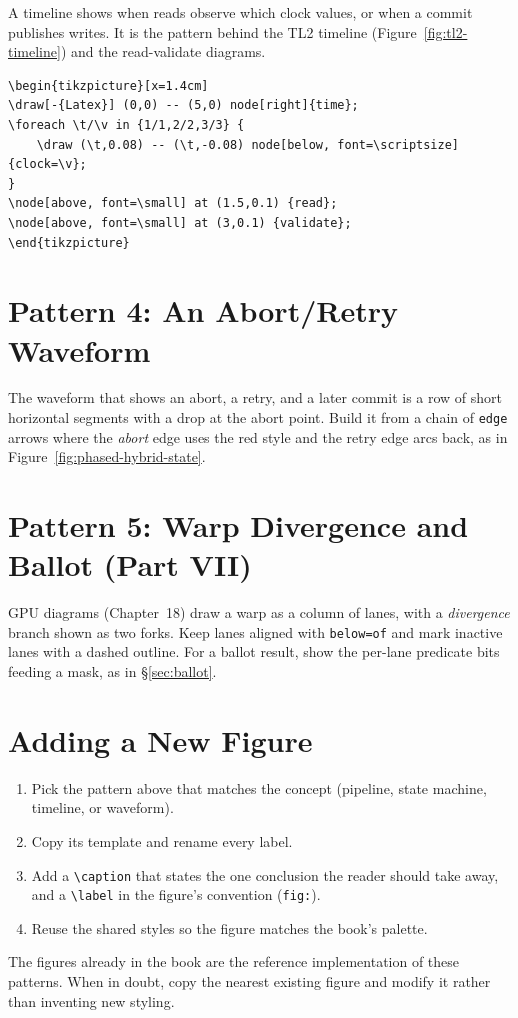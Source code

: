 A timeline shows when reads observe which clock values, or when a commit
publishes writes.  It is the pattern behind the TL2 timeline
(Figure~\ref{fig:tl2-timeline}) and the read-validate diagrams.

\begin{lstlisting}[language={}, caption={A timeline with read and commit markers.}]
\begin{tikzpicture}[x=1.4cm]
\draw[-{Latex}] (0,0) -- (5,0) node[right]{time};
\foreach \t/\v in {1/1,2/2,3/3} {
    \draw (\t,0.08) -- (\t,-0.08) node[below, font=\scriptsize]{clock=\v};
}
\node[above, font=\small] at (1.5,0.1) {read};
\node[above, font=\small] at (3,0.1) {validate};
\end{tikzpicture}
\end{lstlisting}

\section{Pattern 4: An Abort/Retry Waveform}

The waveform that shows an abort, a retry, and a later commit is a row of
short horizontal segments with a drop at the abort point.  Build it from a
chain of \texttt{edge} arrows where the \emph{abort} edge uses the red
style and the retry edge arcs back, as in
Figure~\ref{fig:phased-hybrid-state}.

\section{Pattern 5: Warp Divergence and Ballot (Part VII)}

GPU diagrams (Chapter~18) draw a warp as a column of lanes, with a
\emph{divergence} branch shown as two forks.  Keep lanes aligned with
\texttt{below=of} and mark inactive lanes with a dashed outline.  For a
ballot result, show the per-lane predicate bits feeding a mask, as in
\S\ref{sec:ballot}.

\section{Adding a New Figure}

\begin{enumerate}
    \item Pick the pattern above that matches the concept (pipeline,
          state machine, timeline, or waveform).
    \item Copy its template and rename every label.
    \item Add a \texttt{\textbackslash caption} that states the one
          conclusion the reader should take away, and a
          \texttt{\textbackslash label} in the figure's convention
          (\texttt{fig:}).
    \item Reuse the shared styles so the figure matches the book's palette.
\end{enumerate}

The figures already in the book are the reference implementation of these
patterns.  When in doubt, copy the nearest existing figure and modify it
rather than inventing new styling.
